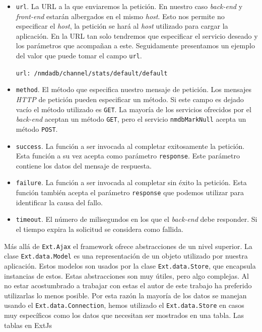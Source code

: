 	\begin{itemize}
		\item	\texttt{url}. La URL a la que enviaremos la petición. En nuestro caso \emph{back-end} y \emph{front-end} estarán albergados en
			el mismo \emph{host}. Esto nos permite no especificar el \emph{host}, la petición se hará al \emph{host} utilizado para cargar
			la aplicación. En la URL tan solo tendremos que especificar el servicio deseado y los parámetros que acompañan a este.
			Seguidamente presentamos un ejemplo del valor que puede tomar el campo \texttt{url}.
    				\begin{center} \texttt{url: \cc/nmdadb/channel/stats/default/default\cc}  \end{center}
		\item	\texttt{method}. El método que especifica nuestro mensaje de petición. Los mensajes \emph{HTTP} de petición pueden especificar
			un método. Si este campo es dejado vacío el método utilizado es \texttt{GET}. La mayoría de los servicios ofrecidos por el
			\emph{back-end} aceptan un método \texttt{GET}, pero el servicio \texttt{nmdbMarkNull} acepta un método \texttt{POST}.
		\item	\texttt{success}. La función a ser invocada al completar exitosamente la petición. Esta función a su vez acepta como parámetro
		  	\texttt{response}. Este parámetro contiene los datos del mensaje de respuesta.
		\item	\texttt{failure}. La función a ser invocada al completar sin éxito la petición. Esta función también acepta el parámetro
		  	\texttt{response} que podemos utilizar para identificar la causa del fallo.
		\item	\texttt{timeout}. El número de milisegundos en los que el \emph{back-end} debe responder. Si el tiempo expira la solicitud se
		  	considera como fallida. 
	\end{itemize}
	Más allá de \texttt{Ext.Ajax} el framework ofrece abstracciones de un nivel superior. La clase \texttt{Ext.data.Model} es una representación
	de un objeto utilizado por nuestra aplicación. Estos modelos son usados por la clase \texttt{Ext.data.Store}, que encapsula instancias de
	estos. Estas abstracciones son muy útiles, pero algo complejas. Al no estar acostumbrado a trabajar con estas el autor de este trabajo ha
	preferido utilizarlas lo menos posible. Por esta razón la mayoría de los datos se manejan usando el \texttt{Ext.data.Connection}, hemos
	utilizado el \texttt{Ext.data.Store} en casos muy específicos como los datos que necesitan ser mostrados en una tabla. Las tablas en ExtJs
